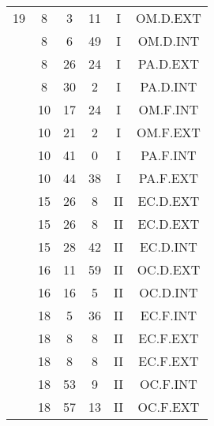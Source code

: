 \documentclass[12pt, a4paper]{article}
\begin{document}
\begin{multicols}{3}
{\begin{tabular}{c c c c c c}
	 	 	 	19 & 8 & 3 & 11 & I & OM.D.EXT\\%
	 	 	 	 & 8 & 6 & 49 & I & OM.D.INT\\%
	 	 	 	 & 8 & 26 & 24 & I & PA.D.EXT\\%
	 	 	 	 & 8 & 30 & 2 & I & PA.D.INT\\%
	 	 	 	 & 10 & 17 & 24 & I & OM.F.INT\\%
	 	 	 	 & 10 & 21 & 2 & I & OM.F.EXT\\%
	 	 	 	 & 10 & 41 & 0 & I & PA.F.INT\\%
	 	 	 	 & 10 & 44 & 38 & I & PA.F.EXT\\%
	 	 	 	 & 15 & 26 & 8 & II & EC.D.EXT\\%
	 	 	 	 & 15 & 26 & 8 & II & EC.D.EXT\\%
	 	 	 	 & 15 & 28 & 42 & II & EC.D.INT\\%
	 	 	 	 & 16 & 11 & 59 & II & OC.D.EXT\\%
	 	 	 	 & 16 & 16 & 5 & II & OC.D.INT\\%
	 	 	 	 & 18 & 5 & 36 & II & EC.F.INT\\%
	 	 	 	 & 18 & 8 & 8 & II & EC.F.EXT\\%
	 	 	 	 & 18 & 8 & 8 & II & EC.F.EXT\\%
	 	 	 	 & 18 & 53 & 9 & II & OC.F.INT\\%
	 	 	 	 & 18 & 57 & 13 & II & OC.F.EXT\\%
	 	 \end{tabular}
 	}
\end{multicols}
\end{document}
